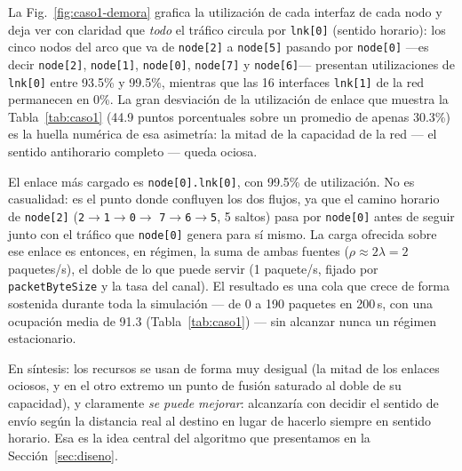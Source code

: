 \documentclass[10pt,letterpaper,twocolumn]{article}
\newcommand{\coltablesetup}{%
  \scriptsize
  \setlength{\tabcolsep}{3pt}%
  \renewcommand{\arraystretch}{1.08}%
}
\begin{document}
La Fig.~\ref{fig:caso1-demora} grafica la utilización de cada interfaz de cada
nodo y deja ver con claridad que \emph{todo} el tráfico circula por
\texttt{lnk[0]} (sentido horario): los cinco nodos del arco que va de
\texttt{node[2]} a \texttt{node[5]} pasando por \texttt{node[0]} ---es decir
\texttt{node[2]}, \texttt{node[1]}, \texttt{node[0]}, \texttt{node[7]} y
\texttt{node[6]}--- presentan utilizaciones de \texttt{lnk[0]} entre 93.5\% y
99.5\%, mientras que las 16 interfaces \texttt{lnk[1]} de la red permanecen en
0\%. La gran desviación de la utilización de enlace que muestra la
Tabla~\ref{tab:caso1} (44.9 puntos porcentuales sobre un promedio de apenas
30.3\%) es la huella numérica de esa asimetría: la mitad de la capacidad de la
red --- el sentido antihorario completo --- queda ociosa.

El enlace más cargado es \texttt{node[0].lnk[0]}, con 99.5\% de utilización. No
es casualidad: es el punto donde confluyen los dos flujos, ya que el camino
horario de \texttt{node[2]} (\texttt{2}$\to$\texttt{1}$\to$\texttt{0}$\to$%
\texttt{7}$\to$\texttt{6}$\to$\texttt{5}, 5 saltos) pasa por \texttt{node[0]}
antes de seguir junto con el tráfico que \texttt{node[0]} genera para sí mismo.
La carga ofrecida sobre ese enlace es entonces, en régimen, la suma de ambas
fuentes ($\rho \approx 2\lambda = 2$ paquetes/s), el doble de lo que puede
servir (1 paquete/s, fijado por \texttt{packetByteSize} y la tasa del canal).
El resultado es una cola que crece de forma sostenida durante toda la
simulación --- de 0 a 190 paquetes en 200\,s, con una ocupación media de 91.3
(Tabla~\ref{tab:caso1}) --- sin alcanzar nunca un régimen estacionario.

En síntesis: los recursos se usan de forma muy desigual (la mitad de los
enlaces ociosos, y en el otro extremo un punto de fusión saturado al doble de
su capacidad), y claramente \emph{se puede mejorar}: alcanzaría con decidir el
sentido de envío según la distancia real al destino en lugar de hacerlo siempre
en sentido horario. Esa es la idea central del algoritmo que presentamos en la
Sección~\ref{sec:diseno}.

\begin{table}[!ht]
  \centering
  \caption{Resultados del Caso~1 (baseline kickstarter, 200\,s, semilla 0). La
  fila ``Ocupación buffer'' corresponde al enlace más cargado
  (\texttt{node[0].lnk[0]}); ``Util.\ enlace'' resume la distribución de
  utilización entre las 16 interfaces de la red.}
  \label{tab:caso1}
  \coltablesetup
\end{table}
\end{document}
